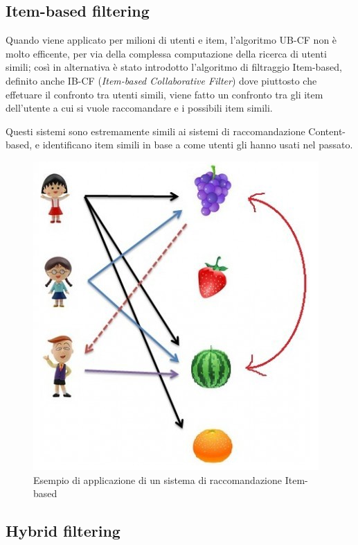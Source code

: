 \subsection{Item-based filtering} 
Quando viene applicato per milioni di utenti e item, l'algoritmo UB-CF non è molto efficente, per via della complessa computazione della 
ricerca di utenti simili; così in alternativa è stato introdotto l'algoritmo di filtraggio Item-based, definito anche IB-CF 
(\textit{Item-based Collaborative Filter}) dove piuttosto che effetuare il confronto tra utenti simili, viene fatto un confronto tra 
gli item dell'utente a cui si vuole raccomandare e i possibili item simili.

Questi sistemi sono estremamente simili ai sistemi di raccomandazione Content-based, e identificano item simili in base a come utenti gli
hanno usati nel passato. \cite{item-based-collaborative-filtering}

\begin{figure}[ht!]
	\centering
	\includegraphics[scale=0.5]{images/IB_CF_ex.PNG}
	\caption{Esempio di applicazione di un sistema di raccomandazione Item-based}
	\label{fig:IB_CF}
\end{figure}


\subsection{Hybrid filtering} 
